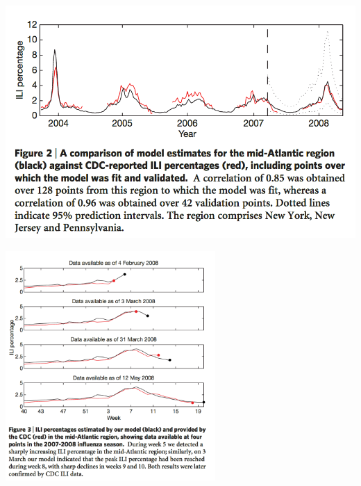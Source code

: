 \documentclass[aspectratio=169]{beamer}
\begin{document}
\begin{frame}

\begin{center}
\includegraphics[width=\textwidth]{figures/ginsberg_detecting_2009_fig2}
\end{center}

\end{frame}
\begin{frame}

\begin{center}
\includegraphics[width=0.6\textwidth]{figures/ginsberg_detecting_2009_fig3}
\end{center}

\end{frame}
\end{document}
